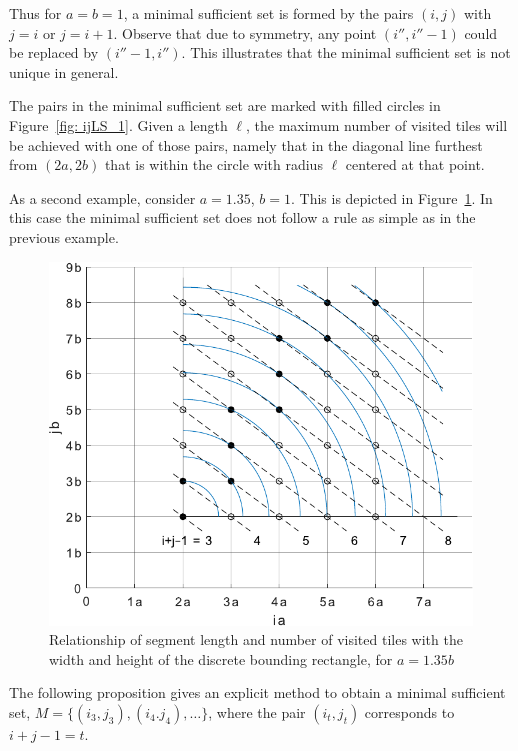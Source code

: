 \documentclass[12pt, a4paper]{article}
\newcommand{\len}{\ell} %
\newcommand{\tiles}{t} %
\newcommand{\mss}{M}
\begin{document}
Thus for $a=b=1$, a minimal sufficient set is formed by the pairs $(i,j)$ with $j=i$ or $j=i+1$. Observe that due to symmetry, any point $(i'',i''-1)$ could be replaced by $(i''-1,i'')$. This illustrates that the minimal sufficient set is not unique in general. 

The pairs in the minimal sufficient set are marked with filled circles in Figure~\ref{fig: ijLS_1}. Given a length $\len$, the maximum number of visited tiles will be achieved with one of those pairs, namely that in the diagonal line furthest from $(2a,2b)$ that is within the circle with radius $\len$ centered at that point.

As a second example, consider $a=1.35$, $b=1$. This is depicted in Figure~\ref{fig: ijLS_1p35}. In this case the minimal sufficient set does not follow a rule as simple as in the previous example.

\begin{figure}
\centering%
\includegraphics[width=.7\textwidth]{ijLS_1p35}%
\caption{Relationship of segment length and number of visited tiles with the width and height of the discrete bounding rectangle, for $a=1.35b$
}%
\label{fig: ijLS_1p35}%
\end{figure}%

The following proposition gives an explicit method to obtain a minimal sufficient set, $\mss = \{(i_3,j_3), (i_4.j_4), \ldots\}$, where the pair $(i_\tiles,j_\tiles)$ corresponds to $i+j-1 = \tiles$.
\end{document}
